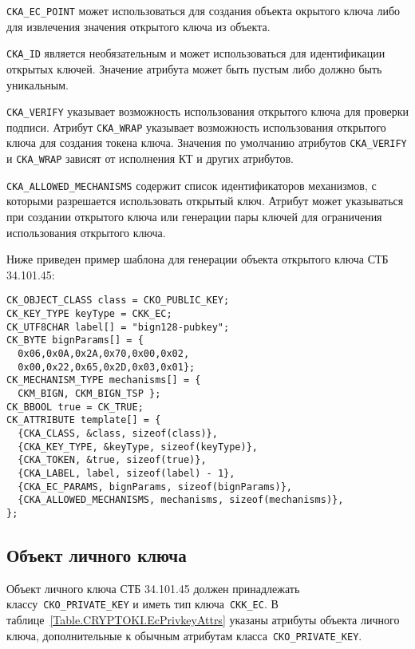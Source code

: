  \verb|CKA_EC_POINT| может использоваться для
создания объекта окрытого ключа либо для извлечения
значения открытого ключа из объекта.

 \verb|CKA_ID| является необязательным и может
использоваться для идентификации открытых ключей.
Значение атрибута может быть пустым либо должно быть уникальным.

 \verb|CKA_VERIFY| указывает возможность
использования открытого ключа для проверки подписи.
Атрибут \verb|CKA_WRAP| указывает возможность
использования открытого ключа для создания токена ключа.
Значения по умолчанию атрибутов \verb|CKA_VERIFY| и \verb|CKA_WRAP|
зависят от исполнения КТ и других атрибутов.

 \verb|CKA_ALLOWED_MECHANISMS| содержит список
идентификаторов механизмов, с которыми разрешается использовать
открытый ключ. Атрибут может указываться при создании открытого
ключа или генерации пары ключей для ограничения использования
открытого ключа.

Ниже приведен пример шаблона для генерации объекта открытого ключа СТБ 34.101.45:
\begin{verbatim}
CK_OBJECT_CLASS class = CKO_PUBLIC_KEY;
CK_KEY_TYPE keyType = CKK_EC;
CK_UTF8CHAR label[] = "bign128-pubkey";
CK_BYTE bignParams[] = {
  0x06,0x0A,0x2A,0x70,0x00,0x02,
  0x00,0x22,0x65,0x2D,0x03,0x01};
CK_MECHANISM_TYPE mechanisms[] = {
  CKM_BIGN, CKM_BIGN_TSP };
CK_BBOOL true = CK_TRUE;
CK_ATTRIBUTE template[] = {
  {CKA_CLASS, &class, sizeof(class)},
  {CKA_KEY_TYPE, &keyType, sizeof(keyType)},
  {CKA_TOKEN, &true, sizeof(true)},
  {CKA_LABEL, label, sizeof(label) - 1},
  {CKA_EC_PARAMS, bignParams, sizeof(bignParams)},
  {CKA_ALLOWED_MECHANISMS, mechanisms, sizeof(mechanisms)},
};
\end{verbatim}


\subsection{Объект личного ключа}


Объект личного ключа СТБ 34.101.45 должен принадлежать
классу~\verb|CKO_PRIVATE_KEY| и иметь тип ключа~\verb|CKK_EC|.
В таблице~\ref{Table.CRYPTOKI.EcPrivkeyAttrs} указаны
атрибуты объекта личного ключа, дополнительные к обычным
атрибутам класса~\verb|CKO_PRIVATE_KEY|.

